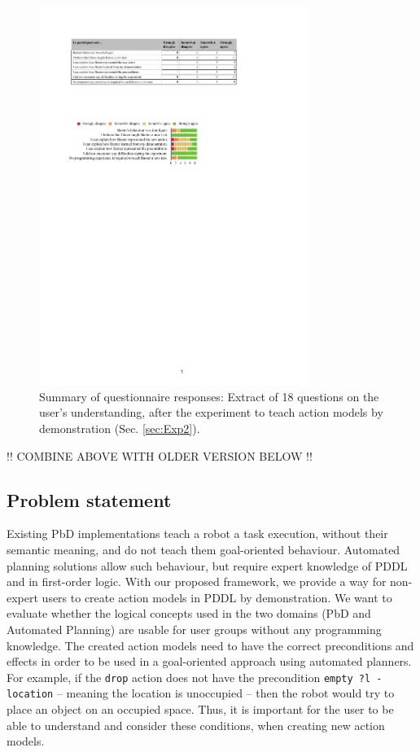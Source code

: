  \begin{figure}[t]
  \centering
  \includegraphics[width=8.7cm]{figures/eEvaluation1}
  \caption{Summary of questionnaire responses: Extract of 18 questions on the user's understanding, after the experiment to teach action models by demonstration (Sec. \ref{sec:Exp2}).}
  \label{fig:eEvaluation1}
\end{figure}



!! COMBINE ABOVE WITH OLDER VERSION BELOW !!


\subsection{Problem statement}
Existing PbD implementations teach a robot a task execution, without their semantic meaning, and do not teach them goal-oriented behaviour. Automated planning solutions allow such behaviour, but require expert knowledge of PDDL and in first-order logic. With our proposed framework, we provide a way for non-expert users to create action models in PDDL by demonstration. We want to evaluate whether the logical concepts used in the two domains (PbD and Automated Planning) are usable for user groups without any programming knowledge.
The created action models need to have the correct preconditions and effects in order to be used in a goal-oriented approach using automated planners. For example, if the \texttt{drop} action does not have the precondition \texttt{empty ?l - location} -- meaning the location is unoccupied -- then the robot would try to place an object on an occupied space. Thus, it is important for the user to be able to understand and consider these conditions, when creating new action models. 

